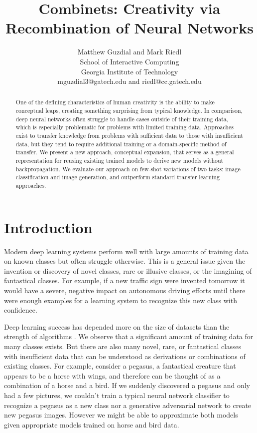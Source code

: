 \documentclass[letterpaper]{article}
\begin{document}
\title{Combinets: Creativity via Recombination of Neural Networks}
\author{Matthew Guzdial and Mark Riedl\\
School of Interactive Computing\\
Georgia Institute of Technology\\
mguzdial3@gatech.edu and riedl@cc.gatech.edu\\
}
\maketitle

\begin{abstract}
One of the defining characteristics of human creativity is the ability to make conceptual leaps, creating something surprising from typical knowledge.
In comparison, deep neural networks often struggle to handle cases outside of their training data, which is especially problematic for problems with limited training data.
Approaches exist to transfer knowledge from problems with sufficient data to those with insufficient data, but they tend to require additional training or a domain-specific method of transfer.
We present a new approach, conceptual expansion, that serves as a general representation for reusing existing trained models to derive new models without backpropagation.
We evaluate our approach on few-shot variations of two tasks: image classification and image generation, and outperform standard transfer learning approaches.

\end{abstract}

\section{Introduction}

Modern deep learning systems perform well with large amounts of training data on known classes but often struggle otherwise. This is a general issue given the invention or discovery of novel classes, rare or illusive classes, or the imagining of fantastical classes. For example, if a new traffic sign were invented tomorrow it would have a severe, negative impact on autonomous driving efforts until there were enough examples for a learning system to recognize this new class with confidence.

Deep learning success has depended more on the size of datasets than the strength of algorithms \cite{UnreasonableEffectivenessOfData}. 
We observe that a significant amount of training data for many classes exists. 
But there are also many novel, rare, or fantastical classes with insufficient data that can be understood as derivations or combinations of existing classes. 
For example, consider a pegasus, a fantastical creature that appears to be a horse with wings, and therefore can be thought of as a combination of a horse and a bird. 
If we suddenly discovered a pegasus and only had a few pictures, we couldn't train a typical neural network classifier to recognize a pegasus as a new class nor a generative adversarial network to create new pegasus images. 
However we might be able to approximate both models given appropriate models trained on horse and bird data.
\end{document}
